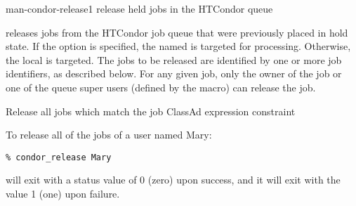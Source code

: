 \begin{ManPage}{}{man-condor-release}{1}
{release held jobs in the HTCondor queue}

\Synopsis {}
\ToolArgsBase 

\ToolDebugOption
\ToolLocate
\ToolJobs
\Bar{}  \Dots

\ToolDebugOption
\ToolLocate
\ToolAll

\Description

 releases jobs from the HTCondor job queue that were 
previously placed in hold state.  
If the  option is specified, the named  is targeted
for processing.  
Otherwise, the local  is targeted.
The jobs to be released are identified by one or more job identifiers, as
described below.
For any given job, only the owner of the job or one of the queue super users
(defined by the  macro) can release the job.

\begin{Options}
	\ToolArgsBaseDesc
	\ToolLocateDesc
	\ToolDebugDesc
	 {Release all jobs which match
	                the job ClassAd expression constraint}
\end{Options}

\SeeAlso
{}


\Examples
To release all of the jobs of a user named Mary:
\footnotesize
\begin{verbatim}
% condor_release Mary 
\end{verbatim}
\normalsize

\ExitStatus

 will exit with a status value of 0 (zero) upon success,
and it will exit with the value 1 (one) upon failure.

\end{ManPage}
